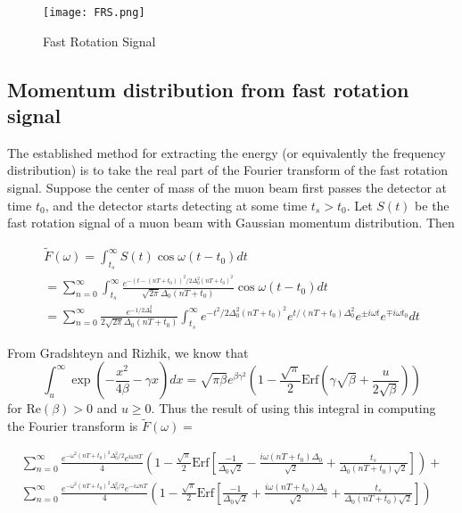 \documentclass{article}
\begin{document}
\begin{figure}[here]\begin{center}\texttt{[image: FRS.png]}\caption{Fast Rotation Signal}\end{center}\end{figure}


\subsection{Momentum distribution from fast rotation signal}

The established method for extracting the energy (or equivalently the frequency distribution) is to take the real part of the Fourier transform of the fast rotation signal. Suppose the center of mass of the muon beam first passes the detector at time $t_0$, and the detector starts detecting at some time $t_s>t_0$.  Let $S(t)$ be the fast rotation signal of a muon beam with Gaussian momentum distribution. Then  

\begin{gather}
\tilde{F}(\omega)=\int^{\infty}_{t_s}S(t)\cos\omega(t-t_0) dt \nonumber \\
=\sum^{\infty}_{n=0}\int^{\infty}_{t_s}\frac{e^{-(t-(nT+t_0))^2/2\Delta^2_0(nT+t_0)^2}}{\sqrt{2\pi}\Delta_0(nT+t_0)}\cos\omega(t-t_0)dt \nonumber \\ 
=\sum^{\infty}_{n=0}\frac{e^{-1/2\Delta^2_0}}{2\sqrt{2\pi}\Delta_0(nT+t_0)}\int^{\infty}_{t_s}e^{-t^2/2\Delta^2_0(nT+t_0)^2}e^{t/(nT+t_0)\Delta^2_0}e^{\pm i\omega t}e^{\mp i\omega t_0}dt
\end{gather}




From Gradshteyn and Rizhik, we know that 
\begin{equation}
\int^{\infty}_u\exp\left(-\frac{x^2}{4\beta}-\gamma x\right)dx=\sqrt{\pi\beta}e^{\beta\gamma^2}\left(1-\frac{\sqrt{\pi}}{2}\text{Erf}\left(\gamma\sqrt{\beta}+\frac{u}{2\sqrt{\beta}}\right)\right)
\end{equation}
for $\text{Re}(\beta)>0$ and $u\geq0$. Thus the result of using this integral in computing the Fourier transform is $\tilde{F}(\omega)=$ 

\begin{gather}
\sum^{\infty}_{n=0}\frac{e^{-\omega^2(nT+t_0)^2\Delta^2_0/2}e^{i\omega nT}}{4}\left(1-\frac{\sqrt{\pi}}{2}\text{Erf}\left[\frac{-1}{\Delta_0\sqrt{2}}-\frac{i\omega (nT+t_0)\Delta_0}{\sqrt{2}}+\frac{t_s}{\Delta_0(nT+t_0)\sqrt{2}}\right]\right)+ \nonumber \\
\sum^{\infty}_{n=0}\frac{e^{-\omega^2(nT+t_0)^2\Delta^2_0/2}e^{-i\omega nT}}{4}\left(1-\frac{\sqrt{\pi}}{2}\text{Erf}\left[\frac{-1}{\Delta_0\sqrt{2}}+\frac{i\omega (nT+t_0)\Delta_0}{\sqrt{2}}+\frac{t_s}{\Delta_0(nT+t_0)\sqrt{2}}\right]\right)
\end{gather}
\end{document}
